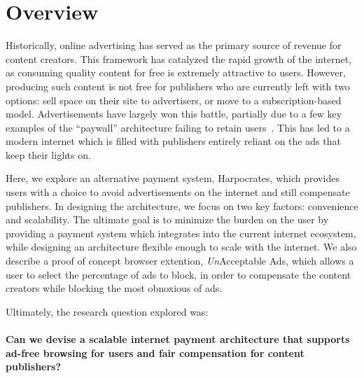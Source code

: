 
\section{Overview}
Historically, online advertising has served as the primary source of revenue for content creators.
This framework has catalyzed the rapid growth of the internet, as consuming quality content for free is extremely attractive to users.
However, producing such content is not free for publishers who are currently left with two options: sell space on their site to advertisers, or move to a subscription-based model.
Advertisements have largely won this battle, partially due to a few key examples of the “paywall” architecture failing to retain users~\cite{nyt}.
This has led to a modern internet which is filled with publishers entirely reliant on the ads that keep their lights on.

Here, we explore an alternative payment system, Harpocrates, which provides users with a choice to avoid advertisements on the internet and still compensate publishers.
In designing the architecture, we focus on two key factors: convenience and scalability.
The ultimate goal is to minimize the burden on the user by providing a payment system which integrates into the current internet ecosystem, while designing an architecture flexible enough to scale with the internet.
We also describe a proof of concept browser extention, \textit{Un}Acceptable Ads, which allows a user to select the percentage of ads to block, in order to compensate the content creators while blocking the most obnoxious of ads.

Ultimately, the research question explored was: \\
\\
\textbf{Can we devise a scalable internet payment architecture that supports ad-free browsing for users and fair compensation for content publishers?}
